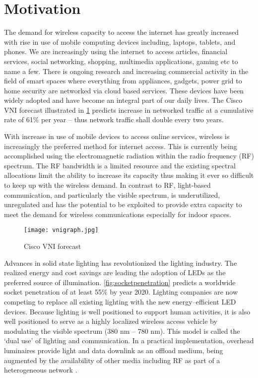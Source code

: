 \section{Motivation}
\label{sec:motivation}
\graphicspath{{_Intro/Figures/}}

The demand for wireless capacity to access the internet has greatly increased with rise in use of mobile computing devices including, laptops, tablets, and phones. We are increasingly using the internet to access articles, financial services, social networking, shopping, multimedia applications, gaming etc to name a few. There is ongoing research and increasing commercial activity in the field of smart spaces where everything from appliances, gadgets, power grid to home security are networked via cloud based services. These devices have been widely adopted and have become an integral part of our daily lives. The Cisco VNI forecast illustrated in \figurename{ \ref{fig:vnigraph}} predicts increase in networked traffic at a cumulative rate of 61$\%$ per year -- thus network traffic shall double every two years. 

With increase in use of mobile devices to access online services, wireless is increasingly the preferred method for internet access. This is currently being accomplished using the electromagnetic radiation within the radio frequency (RF) spectrum. The RF bandwidth is a limited resource and the existing spectral allocations limit the ability to increase its capacity thus making it ever so difficult to keep up with the wireless demand. In contrast to RF, light-based communication, and particularly the visible spectrum, is underutilized, unregulated and has the potential to be exploited to provide extra capacity to meet the demand for wireless communications especially for indoor spaces. 

\begin{figure}[!t]
	\centering
		\texttt{[image: vnigraph.jpg]}
	\caption{Cisco VNI forecast}
	\label{fig:vnigraph}
\end{figure}

Advances in solid state lighting has revolutionized the lighting industry. The realized energy and cost savings are leading the adoption of LEDs as the preferred source of illumination. \figurename{ \ref{fig:socketpenetration}} \cite{bar11a} predicts a worldwide socket penetration of at least 55$\%$ by year 2020. Lighting companies are now competing to replace all existing lighting with the new energy--efficient LED devices. Because lighting is well positioned to support human activities, it is also well positioned to serve as a highly localized wireless access vehicle by modulating the visible spectrum (380 nm -- 780 nm). This model is called the `dual use' of lighting and communication. In a practical implementation, overhead luminaires provide light and data downlink as an offload medium, being augmented by the availability of other media including RF as part of a heterogeneous network \cite{gan13a,rah15a}. 

